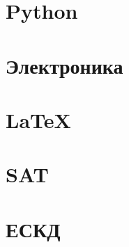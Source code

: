 \documentclass[oneside,12pt]{article}
\newcommand{\py}{Python}
\begin{document}
\section{\py}
\cite{pyotkidach,pythink}

\section{Электроника}
\cite{bcollis}

\section{\LaTeX}
\cite{ebooktex,bibiso}

\section{SAT} 
\cite{geektimes240554,VangliSAT}

\section{ЕСКД}
\cite{
gost2701, gost2702, gost2703, gost2704, gost2705, gost2708, gost2709, gost2710,
gost2711, gost2721, gost2722, gost2723, gost2725, gost2726, gost2727, gost2728,
gost2829, gost2730, gost2731, gost2732, gost2733, gost2734, gost2735, gost2736,
gost2737, gost2741, gost2742, gost2743, gost2744, gost2745, gost2746, gost2747,
gost2751, gost2755, gost2756, gost2758, gost2759, gost2761, gost2762
}

\printbibliography
\end{document}
